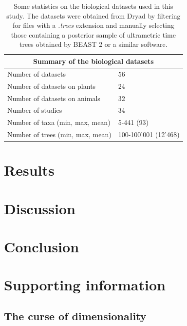 \documentclass[10pt,letterpaper]{article}
\begin{document}
\begin{table}[h]
	\caption{Some statistics on the biological datasets used in this study. The datasets were obtained from Dryad \cite{dryad} by filtering for files with a \emph{.trees} extension and manually selecting those containing a posterior sample of ultrametric time trees obtained by BEAST 2 or a similar software.}
	\label{table-bio-datasets}

	\centering
	\begin{tabular}{@{}ll@{}}
		\toprule
		\multicolumn{2}{c}{Summary of the biological datasets} \\
		\midrule
		Number of datasets	& 56 \\
		Number of datasets on plants & 24 \\
		Number of datasets on animals & 32 \\
		Number of studies	& 34 \\
		Number of taxa (min, max, mean) & 5-441 (93) \\
		Number of trees (min, max, mean) & 100-100'001 (12'468) \\
		\bottomrule
	\end{tabular}
\end{table}

\section*{Results}

\section*{Discussion}

\section*{Conclusion}

\section*{Supporting information}

\subsection*{The curse of dimensionality}
\end{document}
